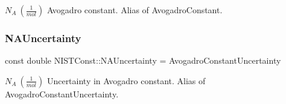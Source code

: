 $N_A \ (\frac{1}{mol})$ Avogadro constant. Alias of Avogadro\+Constant. \mbox{\label{group___avogadro_constant_ga37f2994955ace9aed8e44bd3699f0b50}} 
\subsubsection{\texorpdfstring{N\+A\+Uncertainty}{NAUncertainty}}
{\footnotesize\ttfamily const double N\+I\+S\+T\+Const\+::\+N\+A\+Uncertainty = Avogadro\+Constant\+Uncertainty}

$N_A \ (\frac{1}{mol})$ Uncertainty in Avogadro constant. Alias of Avogadro\+Constant\+Uncertainty. 